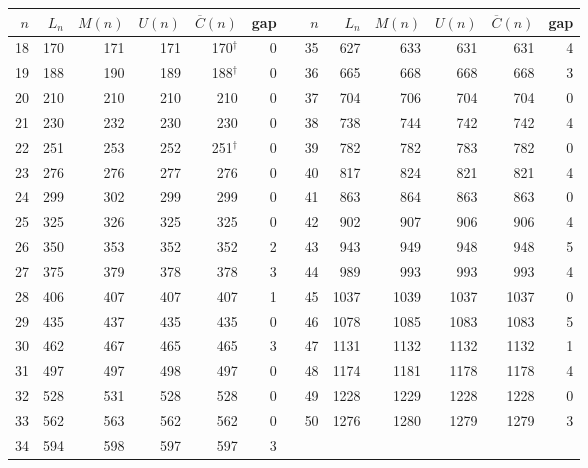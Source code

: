 \begin{tabular}{@{}rrrrrr@{\hspace{1.6em}}c@{\hspace{1.6em}}rrrrrr@{}}
\toprule
$n$ & $L_n$ & $M(n)$ & $U(n)$ & $\overline C(n)$ & gap & & $n$ & $L_n$ & $M(n)$ & $U(n)$ & $\overline C(n)$ & gap \\
\midrule
18 & 170 & 171 & 171 & 170$^{\dagger}$ & 0 & & 35 & 627 & 633 & 631 & 631 & 4 \\
19 & 188 & 190 & 189 & 188$^{\dagger}$ & 0 & & 36 & 665 & 668 & 668 & 668 & 3 \\
20 & 210 & 210 & 210 & 210 & 0 & & 37 & 704 & 706 & 704 & 704 & 0 \\
21 & 230 & 232 & 230 & 230 & 0 & & 38 & 738 & 744 & 742 & 742 & 4 \\
22 & 251 & 253 & 252 & 251$^{\dagger}$ & 0 & & 39 & 782 & 782 & 783 & 782 & 0 \\
23 & 276 & 276 & 277 & 276 & 0 & & 40 & 817 & 824 & 821 & 821 & 4 \\
24 & 299 & 302 & 299 & 299 & 0 & & 41 & 863 & 864 & 863 & 863 & 0 \\
25 & 325 & 326 & 325 & 325 & 0 & & 42 & 902 & 907 & 906 & 906 & 4 \\
26 & 350 & 353 & 352 & 352 & 2 & & 43 & 943 & 949 & 948 & 948 & 5 \\
27 & 375 & 379 & 378 & 378 & 3 & & 44 & 989 & 993 & 993 & 993 & 4 \\
28 & 406 & 407 & 407 & 407 & 1 & & 45 & 1037 & 1039 & 1037 & 1037 & 0 \\
29 & 435 & 437 & 435 & 435 & 0 & & 46 & 1078 & 1085 & 1083 & 1083 & 5 \\
30 & 462 & 467 & 465 & 465 & 3 & & 47 & 1131 & 1132 & 1132 & 1132 & 1 \\
31 & 497 & 497 & 498 & 497 & 0 & & 48 & 1174 & 1181 & 1178 & 1178 & 4 \\
32 & 528 & 531 & 528 & 528 & 0 & & 49 & 1228 & 1229 & 1228 & 1228 & 0 \\
33 & 562 & 563 & 562 & 562 & 0 & & 50 & 1276 & 1280 & 1279 & 1279 & 3 \\
34 & 594 & 598 & 597 & 597 & 3 & & & & & & & \\
\bottomrule
\end{tabular}
